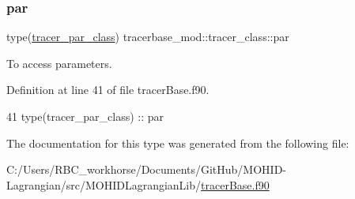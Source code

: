 \subsubsection{\texorpdfstring{par}{par}}
{\footnotesize\ttfamily type(\mbox{\hyperlink{structtracerbase__mod_1_1tracer__par__class}{tracer\+\_\+par\+\_\+class}}) tracerbase\+\_\+mod\+::tracer\+\_\+class\+::par\hspace{0.3cm}{\ttfamily [private]}}



To access parameters. 



Definition at line 41 of file tracer\+Base.\+f90.


\begin{DoxyCode}
41         \textcolor{keywordtype}{type}(tracer\_par\_class)   :: par
\end{DoxyCode}


The documentation for this type was generated from the following file\+:\begin{DoxyCompactItemize}
\item 
C\+:/\+Users/\+R\+B\+C\+\_\+workhorse/\+Documents/\+Git\+Hub/\+M\+O\+H\+I\+D-\/\+Lagrangian/src/\+M\+O\+H\+I\+D\+Lagrangian\+Lib/\mbox{\hyperlink{tracer_base_8f90}{tracer\+Base.\+f90}}\end{DoxyCompactItemize}
